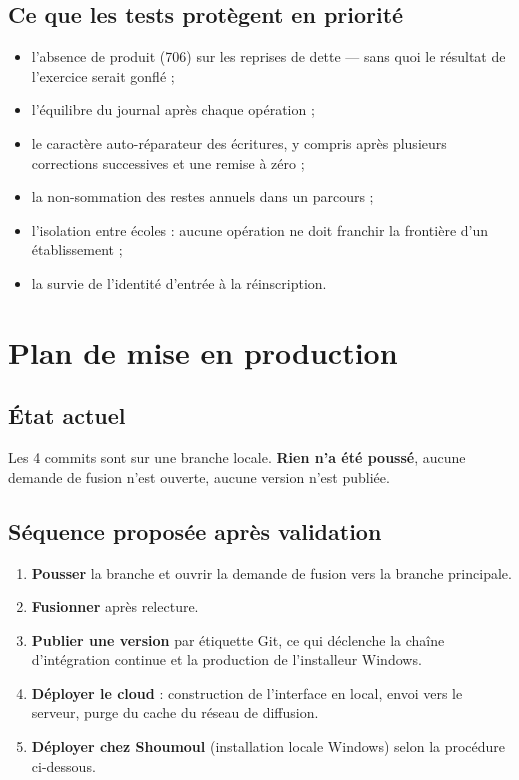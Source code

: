 \documentclass[11pt,a4paper]{report}
\begin{document}
\section{Ce que les tests protègent en priorité}

\begin{itemize}
\item l'absence de produit (706) sur les reprises de dette --- sans quoi le
      résultat de l'exercice serait gonflé ;
\item l'équilibre du journal après chaque opération ;
\item le caractère auto-réparateur des écritures, y compris après plusieurs
      corrections successives et une remise à zéro ;
\item la non-sommation des restes annuels dans un parcours ;
\item l'isolation entre écoles : aucune opération ne doit franchir la frontière
      d'un établissement ;
\item la survie de l'identité d'entrée à la réinscription.
\end{itemize}

\chapter{Plan de mise en production}
\label{chap:deploiement}

\section{État actuel}

Les 4 commits sont sur une branche locale. \textbf{Rien n'a été poussé}, aucune
demande de fusion n'est ouverte, aucune version n'est publiée.

\section{Séquence proposée après validation}

\begin{enumerate}
\item \textbf{Pousser} la branche et ouvrir la demande de fusion vers la
      branche principale.
\item \textbf{Fusionner} après relecture.
\item \textbf{Publier une version} par étiquette Git, ce qui déclenche la
      chaîne d'intégration continue et la production de l'installeur Windows.
\item \textbf{Déployer le cloud} : construction de l'interface en local, envoi
      vers le serveur, purge du cache du réseau de diffusion.
\item \textbf{Déployer chez Shoumoul} (installation locale Windows) selon la
      procédure ci-dessous.
\end{enumerate}
\end{document}
